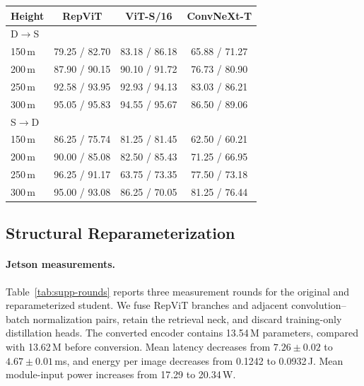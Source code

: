\par\medskip\noindent\begin{minipage}{\columnwidth}
\captionsetup{type=table}
\centering
\caption{Compact-backbone retrieval on SUES-200 by flight height. Cells report R@1 / AP (\%).}
\label{tab:supp-compact-sues}
{\footnotesize\setlength{\tabcolsep}{2pt}\renewcommand{\arraystretch}{1.04}
\begin{tabular*}{\columnwidth}{@{\extracolsep{\fill}}lccc@{}}
\toprule
Height & RepViT & ViT-S/16 & ConvNeXt-T \\
\midrule
\multicolumn{4}{l}{D$\rightarrow$S} \\
150\,m & 79.25 / 82.70 & 83.18 / 86.18 & 65.88 / 71.27 \\
200\,m & 87.90 / 90.15 & 90.10 / 91.72 & 76.73 / 80.90 \\
250\,m & 92.58 / 93.95 & 92.93 / 94.13 & 83.03 / 86.21 \\
300\,m & 95.05 / 95.83 & 94.55 / 95.67 & 86.50 / 89.06 \\
\midrule
\multicolumn{4}{l}{S$\rightarrow$D} \\
150\,m & 86.25 / 75.74 & 81.25 / 81.45 & 62.50 / 60.21 \\
200\,m & 90.00 / 85.08 & 82.50 / 85.43 & 71.25 / 66.95 \\
250\,m & 96.25 / 91.17 & 63.75 / 73.35 & 77.50 / 73.18 \\
300\,m & 95.00 / 93.08 & 86.25 / 70.05 & 81.25 / 76.44 \\
\bottomrule
\end{tabular*}}
\end{minipage}\par\medskip

\subsection{Structural Reparameterization}
\paragraph{Jetson measurements.}
Table~\ref{tab:supp-rounds} reports three measurement rounds for the original and reparameterized student. We fuse RepViT branches and adjacent convolution--batch normalization pairs, retain the retrieval neck, and discard training-only distillation heads. The converted encoder contains 13.54\,M parameters, compared with 13.62\,M before conversion. Mean latency decreases from $7.26\pm0.02$ to $4.67\pm0.01$\,ms, and energy per image decreases from 0.1242 to 0.0932\,J. Mean module-input power increases from 17.29 to 20.34\,W.

